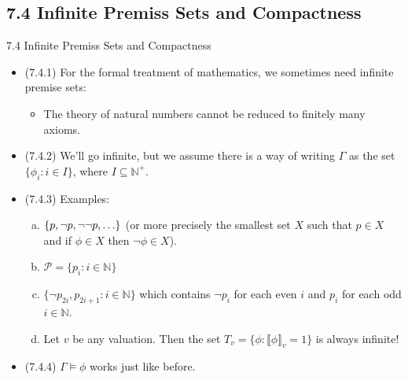 \subsection{7.4 Infinite Premiss Sets and Compactness}

\begin{frame}{7.4 Infinite Premiss Sets and Compactness}

	\begin{itemize}
	
		\item (7.4.1) For the formal treatment of mathematics, we sometimes need infinite premise sets:
		\begin{itemize}
		
			\item The theory of natural numbers cannot be reduced to finitely many axioms.
		
		\end{itemize}
		
		\item (7.4.2) We'll go infinite, but we assume there is a way of writing $\Gamma$ as the set $\{\phi_i:i\in I\}$, where $I\subseteq\mathbb{N}^+$.
		
		\item (7.4.3) Examples:
		
			\begin{enumerate}[(a)]
		
			\item $\{p, \neg p, \neg\neg p, \mathellipsis\}$ (or more precisely the smallest set $X$ such that $p\in X$ and if $\phi\in X$ then $\neg \phi\in X$).
			
			
			\item $\mathcal{P}=\{p_i: i\in \mathbb{N}\}$
						
			\item $\{\neg p_{2i}, p_{2i+1}: i\in\mathbb{N}\}$ which contains $\neg p_i$ for each even $i$ and $p_i$ for each odd $i\in\mathbb{N}$.
			
			\item Let $v$ be any valuation. Then the set $T_v=\{\phi:\llbracket\phi\rrbracket_v=1\}$ is always infinite! 
					
		\end{enumerate}
		
		\item (7.4.4) $\Gamma\vDash\phi$ works just like before.
	
	\end{itemize}

\end{frame}

